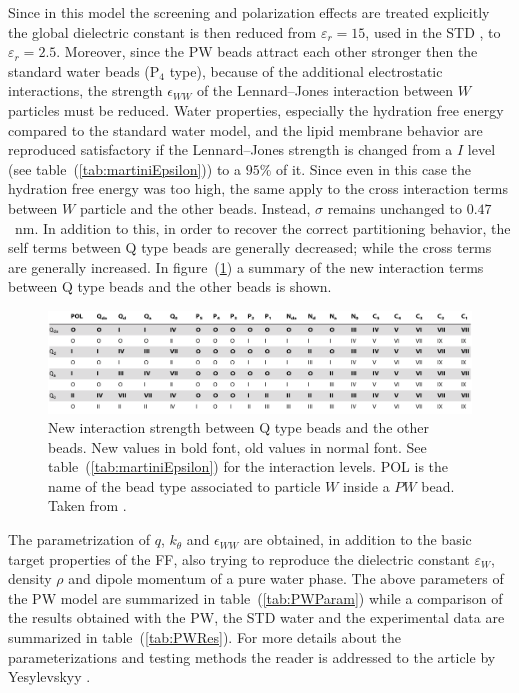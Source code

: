 Since in this model the screening and polarization effects are treated explicitly the global dielectric constant
is then reduced from $\varepsilon_r = 15$, used in the \ac{STD} \martini{}, to $\varepsilon_r = 2.5$. Moreover,
since the \ac{PW} beads attract each other stronger then the standard water beads (P$_4$ type), because of the 
additional electrostatic interactions, the strength $\epsilon_{WW}$ of the Lennard--Jones interaction between 
$W$ particles must be reduced. Water properties, especially the hydration free energy compared to the standard 
water model, and the lipid membrane behavior are reproduced satisfactory if the Lennard--Jones strength is 
changed from a $I$ level (see table~(\ref{tab:martiniEpsilon})) to a $95\%{}$ of it. Since even in this case the 
hydration free energy was too high, the same apply to the cross interaction terms between $W$ particle and the 
other \martini{} beads. Instead, $\sigma$ remains unchanged to $0.47$~nm. In addition to this, in order to recover 
the correct partitioning behavior, the self terms between Q type beads are generally decreased; while the cross 
terms are generally increased. In figure~(\ref{fig:PWMartini}) a summary of the new interaction terms between Q 
type beads and the other beads is shown.
\begin{figure}[!ht]
	\centering
	\includegraphics[width=\textwidth]{./img/PWMartini}
	\caption{New interaction strength between Q type beads and the other beads. New values in bold font, old values in normal font. See table~(\ref{tab:martiniEpsilon}) for the interaction levels. POL is the name of the \martini{} bead type associated to particle $W$ inside a $PW$ bead. Taken from \cite{PW}.}%
	\label{fig:PWMartini}
\end{figure}

The parametrization of $q$, $k_\theta$ and $\epsilon_{WW}$ are obtained, in addition to the basic target
properties of the \martini{} \ac{FF}, also trying to reproduce the dielectric constant $\varepsilon_{W}$, density
$\rho$ and dipole momentum of a pure water phase. The above parameters of the \ac{PW} model are summarized in
table~(\ref{tab:PWParam}) while a comparison of the results obtained with the \ac{PW}, the \ac{STD} \martini{}
water and the experimental data are summarized in table~(\ref{tab:PWRes}). For more details about the
parameterizations and testing methods the reader is
addressed to the article by Yesylevskyy \etal{} \cite{PW}.


